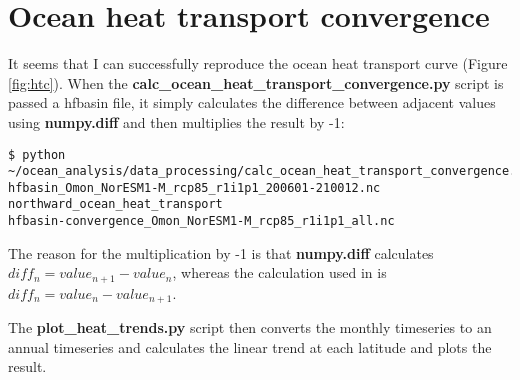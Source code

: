 \section{Ocean heat transport convergence}

It seems that I can successfully reproduce the ocean heat transport curve (Figure \ref{fig:htc}). When the \textbf{calc_ocean_heat_transport_convergence.py} script is passed a hfbasin file, it simply calculates the difference between adjacent values using \textbf{numpy.diff} and then multiplies the result by -1:

\begin{verbatim}
$ python ~/ocean_analysis/data_processing/calc_ocean_heat_transport_convergence.py
hfbasin_Omon_NorESM1-M_rcp85_r1i1p1_200601-210012.nc
northward_ocean_heat_transport
hfbasin-convergence_Omon_NorESM1-M_rcp85_r1i1p1_all.nc
\end{verbatim}

The reason for the multiplication by -1 is that \textbf{numpy.diff} calculates $diff_{n} = value_{n+1} - value_{n}$, whereas the calculation used in \citet{Nummelin_2017} is $diff_{n} = value_{n} - value_{n+1}$.    

The \textbf{plot_heat_trends.py} script then converts the monthly timeseries to an annual timeseries and calculates the linear trend at each latitude and plots the result. 